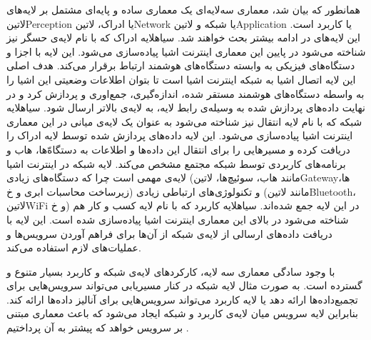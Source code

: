 همانطور که بیان شد، معماری سه‌لایه‌ای یک معماری ساده و پایه‌ای مشتمل بر لایه‌های ‌لاتین{Perception} یا ادراک، ‌لاتین{Network} یا شبکه و ‌لاتین{Application} یا کاربرد است.
این لایه‌های در ادامه بیشتر بحث خواهند شد.
 ‌سیاه{لایه ادراک} که با نام لایه‌ی حسگر نیز شناخته می‌شود در پایین این معماری اینترنت اشیا پیاده‌سازی می‌شود. این لایه با اجزا و دستگاه‌های فیزیکی به وابسته دستگاه‌های هوشمند ارتباط برقرار می‌کند.
هدف اصلی این لایه اتصال اشیا به شبکه اینترنت اشیا است تا بتوان اطلاعات وضعیتی این اشیا را به واسطه دستگاه‌های هوشمند مستقر شده، اندازه‌گیری، جمع‌اوری و پردازش کرد و در نهایت داده‌های پردازش شده به
وسیله‌ی رابط لایه، به لایه‌ی بالاتر ارسال شود.
 ‌سیاه{لایه شبکه} که با نام لایه انتقال نیز شناخته می‌شود به عنوان یک لایه‌ی میانی در این معماری اینترنت اشیا پیاده‌سازی می‌شود. این لایه داده‌های پردازش شده توسط لایه ادراک را دریافت کرده و
مسیرهایی را برای انتقال این داده‌ها و اطلاعات به دستگاه‌ّها، هاب و برنامه‌های کاربردی توسط شبکه مجتمع مشخص می‌کند. لایه شبکه در اینترنت اشیا لایه‌ی مهمی است چرا که دستگاه‌های زیادی (مانند
هاب، سوئیچ‌ها، ‌لاتین{Gateway}ها، زیرساخت محاسبات ابری و ‌خ) و تکنولوژی‌های ارتباطی زیادی (مانند ‌لاتین{Bluetooth}، ‌لاتین{WiFi} و ‌خ) در این لایه جمع شده‌اند.
 ‌سیاه{لایه کاربرد} که با نام لایه کسب و کار هم شناخته می‌شود در بالای این معماری اینترنت اشیا پیاده‌سازی شده است. این لایه با دریافت داده‌های ارسالی از لایه‌ی شبکه از آن‌ها برای فراهم آوردن
سرویس‌ها و عملیات‌های لازم استفاده می‌کند.

با وجود سادگی معماری سه لایه، کارکردهای لایه‌ی شبکه و کاربرد بسیار متنوع و گسترده است. به صورت مثال لایه شبکه در کنار مسیریابی می‌تواند سرویس‌هایی برای تجمبع‌داده‌ها ارائه دهد یا لایه کاربرد
می‌تواند سرویس‌هایی برای آنالیز داده‌ها ارائه کند. بنابراین لایه سرویس میان لایه‌ی کاربرد و شبکه ایجاد می‌شود که باعث معماری مبتنی بر سرویس خواهد که پیشتر به آن پرداختیم
.


